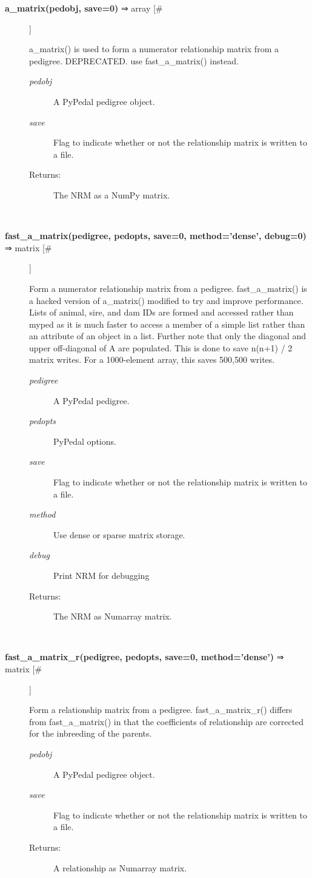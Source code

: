 \documentclass{article}
\begin{document}
\begin{description}
\item[\textbf{a\_matrix(pedobj, save=0)} ⇒ array [\#]
]
\par a\_matrix() is used to form a numerator relationship matrix from a pedigree.  DEPRECATED.
use fast\_a\_matrix() instead.
\begin{description}
\item[\textit{pedobj}
]
A PyPedal pedigree object.
\item[\textit{save}
]
Flag to indicate whether or not the relationship matrix is written to a file.
\item[Returns:
]
The NRM as a NumPy matrix.
\end{description}\\

\item[\textbf{fast\_a\_matrix(pedigree, pedopts, save=0, method='dense', debug=0)} ⇒ matrix [\#]
]
\par Form a numerator relationship matrix from a pedigree.  fast\_a\_matrix() is a hacked version of a\_matrix()
modified to try and improve performance.  Lists of animal, sire, and dam IDs are formed and accessed rather
than myped as it is much faster to access a member of a simple list rather than an attribute of an object in a
list.  Further note that only the diagonal and upper off-diagonal of A are populated.  This is done to save
n(n+1) / 2 matrix writes.  For a 1000-element array, this saves 500,500 writes.
\begin{description}
\item[\textit{pedigree}
]
A PyPedal pedigree.
\item[\textit{pedopts}
]
PyPedal options.
\item[\textit{save}
]
Flag to indicate whether or not the relationship matrix is written to a file.
\item[\textit{method}
]
Use dense or sparse matrix storage.
\item[\textit{debug}
]
Print NRM for debugging
\item[Returns:
]
The NRM as Numarray matrix.
\end{description}\\

\item[\textbf{fast\_a\_matrix\_r(pedigree, pedopts, save=0, method='dense')} ⇒ matrix [\#]
]
\par Form a relationship matrix from a pedigree.  fast\_a\_matrix\_r() differs from fast\_a\_matrix() in that the
coefficients of relationship are corrected for the inbreeding of the parents.
\begin{description}
\item[\textit{pedobj}
]
A PyPedal pedigree object.
\item[\textit{save}
]
Flag to indicate whether or not the relationship matrix is written to a file.
\item[Returns:
]
A relationship as Numarray matrix.
\end{description}\\


\end{description}
\end{document}
